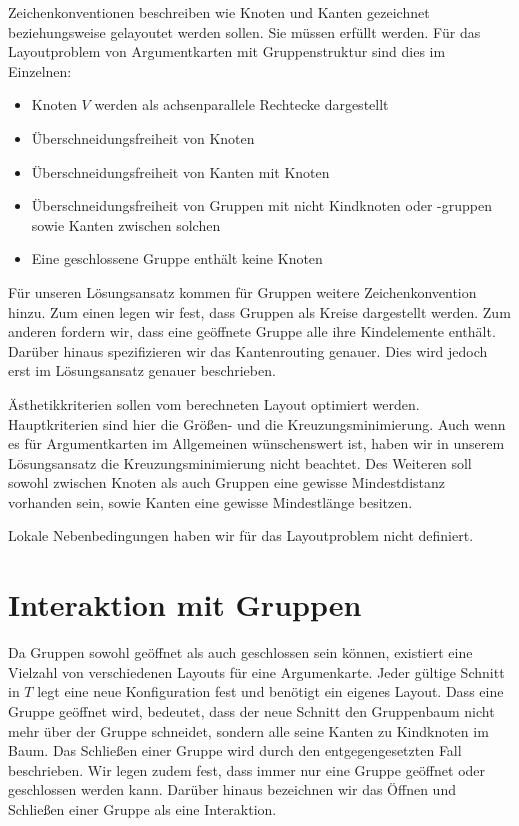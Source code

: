 Zeichenkonventionen beschreiben wie Knoten und Kanten gezeichnet beziehungsweise gelayoutet werden sollen. Sie müssen erfüllt werden.
Für das Layoutproblem von Argumentkarten mit Gruppenstruktur sind dies im Einzelnen:
\begin{itemize}
\item Knoten $V$ werden als achsenparallele Rechtecke dargestellt
\item Überschneidungsfreiheit von Knoten
\item Überschneidungsfreiheit von Kanten mit Knoten
\item Überschneidungsfreiheit von Gruppen mit nicht Kindknoten oder -gruppen sowie Kanten zwischen solchen
\item Eine geschlossene Gruppe enthält keine Knoten
\end{itemize}

Für unseren Lösungsansatz kommen für Gruppen weitere Zeichenkonvention hinzu. Zum einen legen wir fest, dass Gruppen
als Kreise dargestellt werden. Zum anderen fordern wir, dass eine geöffnete Gruppe alle ihre Kindelemente enthält. 
Darüber hinaus spezifizieren wir das Kantenrouting genauer. Dies wird jedoch erst im Lösungsansatz genauer beschrieben.

Ästhetikkriterien sollen vom berechneten Layout optimiert werden. Hauptkriterien sind hier die Größen- und die Kreuzungsminimierung.
Auch wenn es für Argumentkarten im Allgemeinen wünschenswert ist, haben wir in unserem Lösungsansatz die Kreuzungsminimierung nicht beachtet.
Des Weiteren soll sowohl zwischen Knoten als auch Gruppen eine gewisse Mindestdistanz vorhanden sein, sowie Kanten eine gewisse Mindestlänge besitzen.

Lokale Nebenbedingungen haben wir für das Layoutproblem nicht definiert.


\section{Interaktion mit Gruppen}
Da Gruppen sowohl geöffnet als auch geschlossen sein können, existiert eine Vielzahl von verschiedenen Layouts für eine Argumenkarte.
Jeder gültige Schnitt in $T$ legt eine neue Konfiguration fest und benötigt ein eigenes Layout. 
Dass eine Gruppe geöffnet wird, bedeutet, dass der neue Schnitt den Gruppenbaum nicht mehr über der Gruppe schneidet, sondern alle seine Kanten zu Kindknoten im Baum.
Das Schließen einer Gruppe wird durch den entgegengesetzten Fall beschrieben. Wir legen zudem fest, dass immer nur eine Gruppe geöffnet oder geschlossen werden kann. Darüber hinaus bezeichnen wir das Öffnen und Schließen einer Gruppe als eine Interaktion.

